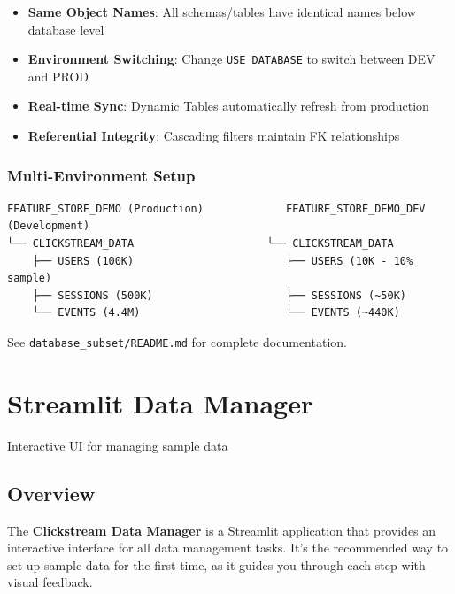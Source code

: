 \documentclass[
  letterpaper,
  DIV=11,
  numbers=noendperiod]{scrreprt}
\providecommand{\tightlist}{%
  \setlength{\itemsep}{0pt}\setlength{\parskip}{0pt}}\usepackage{longtable,booktabs,array}
\begin{document}
\begin{itemize}
\tightlist
\item
  \textbf{Same Object Names}: All schemas/tables have identical names
  below database level
\item
  \textbf{Environment Switching}: Change \texttt{USE\ DATABASE} to
  switch between DEV and PROD
\item
  \textbf{Real-time Sync}: Dynamic Tables automatically refresh from
  production
\item
  \textbf{Referential Integrity}: Cascading filters maintain FK
  relationships
\end{itemize}

\hypertarget{multi-environment-setup}{%
\subsection{Multi-Environment Setup}\label{multi-environment-setup}}

\begin{verbatim}
FEATURE_STORE_DEMO (Production)             FEATURE_STORE_DEMO_DEV (Development)
└── CLICKSTREAM_DATA                     └── CLICKSTREAM_DATA
    ├── USERS (100K)                        ├── USERS (10K - 10% sample)
    ├── SESSIONS (500K)                     ├── SESSIONS (~50K)
    └── EVENTS (4.4M)                       └── EVENTS (~440K)
\end{verbatim}

See \texttt{database\_subset/README.md} for complete documentation.

\hypertarget{streamlit-data-manager}{%
\chapter{Streamlit Data Manager}\label{streamlit-data-manager}}

Interactive UI for managing sample data

\hfill\break

\hypertarget{overview-15}{%
\section{Overview}\label{overview-15}}

The \textbf{Clickstream Data Manager} is a Streamlit application that
provides an interactive interface for all data management tasks. It's
the recommended way to set up sample data for the first time, as it
guides you through each step with visual feedback.
\end{document}
